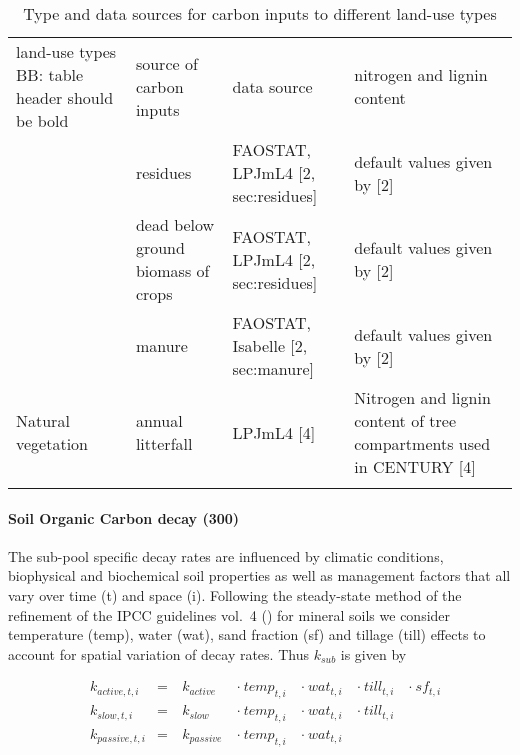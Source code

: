 \documentclass[gc, manuscript]{copernicus}
\begin{document}
 \begin{table*}[h]
 \caption{Type and data sources for carbon inputs to different land-use types }
 \begin{tabular}{l l l l}
 \tophline
  land-use types BB: table header should be bold   & source of carbon inputs & data source & nitrogen and lignin content \\
 \middlehline
 \multirow{3}{*}{Cropland} & residues & FAOSTAT, LPJmL4 [2, sec:residues] & default values given by [2]  \\
                            & dead below ground biomass of crops & FAOSTAT, LPJmL4 [2, sec:residues] & default values given by [2] \\
                            & manure & FAOSTAT, Isabelle [2, sec:manure] & default values given by [2] \\
                            \hline
  Natural vegetation        & annual litterfall & LPJmL4 [4]& \begin{minipage}[t]{0.28\columnwidth}\raggedright\strut Nitrogen and lignin content of tree compartments used in CENTURY [4] \strut \end{minipage}\tabularnewline
 \bottomhline
 \end{tabular}
 \label{tab:datasourceinputs}
 \belowtable{}
 \end{table*}

\hypertarget{sec:tier2}{%
\paragraph{Soil Organic Carbon decay (300)}\label{sec:tier2}}

The sub-pool specific decay rates are influenced by climatic conditions,
biophysical and biochemical soil properties as well as management
factors that all vary over time (t) and space (i). Following the
steady-state method of the refinement of the IPCC guidelines vol.~4
(\citet{ipcc_2019_2019}) for mineral soils we consider temperature
(temp), water (wat), sand fraction (sf) and tillage (till) effects to
account for spatial variation of decay rates. Thus \(k_{sub}\) is given
by

\begin{equation}
\begin{aligned}
& k_{active,t,i}  & = &~ k_{active}  ~ &\cdot~ temp_{t,i} ~ &\cdot~ wat_{t,i} ~ &\cdot~ till_{t,i} ~ & \cdot~ sf_{t,i}\\
& k_{slow,t,i}    & = &~ k_{slow}    ~ &\cdot~ temp_{t,i} ~ &\cdot~ wat_{t,i} ~ &\cdot~ till_{t,i} ~ &\\
& k_{passive,t,i} & = &~ k_{passive} ~ &\cdot~ temp_{t,i} ~ &\cdot~ wat_{t,i} ~ & ~ &
\label{eq:decayrates}
\end{aligned}
\end{equation}
\end{document}
